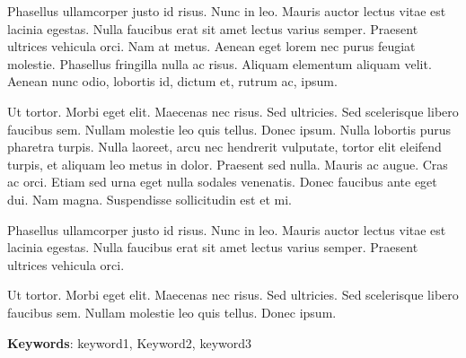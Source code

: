 Phasellus ullamcorper justo id risus. Nunc in leo. Mauris auctor
lectus vitae est lacinia egestas. Nulla faucibus erat sit amet lectus
varius semper. Praesent ultrices vehicula orci. Nam at metus. Aenean
eget lorem nec purus feugiat molestie. Phasellus fringilla nulla ac
risus. Aliquam elementum aliquam velit. Aenean nunc odio, lobortis id,
dictum et, rutrum ac, ipsum. 

Ut tortor. Morbi eget elit. Maecenas nec risus. Sed ultricies. Sed
scelerisque libero faucibus sem. Nullam molestie leo quis
tellus. Donec ipsum. Nulla lobortis purus pharetra turpis. Nulla
laoreet, arcu nec hendrerit vulputate, tortor elit eleifend turpis, et
aliquam leo metus in dolor. Praesent sed nulla. Mauris ac augue. Cras
ac orci. Etiam sed urna eget nulla sodales venenatis. Donec faucibus
ante eget dui. Nam magna. Suspendisse sollicitudin est et mi. 

Phasellus ullamcorper justo id risus. Nunc in leo. Mauris auctor
lectus vitae est lacinia egestas. Nulla faucibus erat sit amet lectus
varius semper. Praesent ultrices vehicula orci. 

Ut tortor. Morbi eget elit. Maecenas nec risus. Sed ultricies. Sed
scelerisque libero faucibus sem. Nullam molestie leo quis
tellus. Donec ipsum. 

\vspace*{10mm}\noindent
\textbf{Keywords}: keyword1, Keyword2, keyword3
